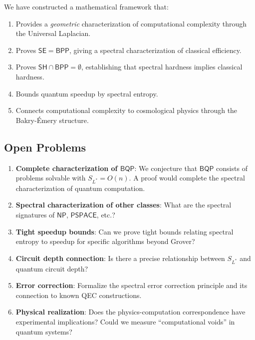 \documentclass[11pt,a4paper]{article}
\theoremstyle{plain}
\theoremstyle{definition}
\theoremstyle{remark}
\newcommand{\BPP}{\mathsf{BPP}}
\newcommand{\BQP}{\mathsf{BQP}}
\newcommand{\SE}{\mathsf{SE}}
\newcommand{\SH}{\mathsf{SH}}
\begin{document}
We have constructed a mathematical framework that:

\begin{enumerate}
    \item Provides a \emph{geometric} characterization of computational complexity through the Universal Laplacian.
    \item Proves $\SE = \BPP$, giving a spectral characterization of classical efficiency.
    \item Proves $\SH \cap \BPP = \emptyset$, establishing that spectral hardness implies classical hardness.
    \item Bounds quantum speedup by spectral entropy.
    \item Connects computational complexity to cosmological physics through the Bakry-\'Emery structure.
\end{enumerate}

\subsection{Open Problems}

\begin{enumerate}
    \item \textbf{Complete characterization of $\BQP$}: We conjecture that $\BQP$ consists of problems solvable with $S_{L^*} = O(n)$. A proof would complete the spectral characterization of quantum computation.

    \item \textbf{Spectral characterization of other classes}: What are the spectral signatures of $\mathsf{NP}$, $\mathsf{PSPACE}$, etc.?

    \item \textbf{Tight speedup bounds}: Can we prove tight bounds relating spectral entropy to speedup for specific algorithms beyond Grover?

    \item \textbf{Circuit depth connection}: Is there a precise relationship between $S_{L^*}$ and quantum circuit depth?

    \item \textbf{Error correction}: Formalize the spectral error correction principle and its connection to known QEC constructions.

    \item \textbf{Physical realization}: Does the physics-computation correspondence have experimental implications? Could we measure ``computational voids'' in quantum systems?
\end{enumerate}
\end{document}
